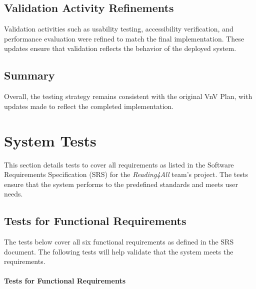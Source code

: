\documentclass[12pt, titlepage]{article}
\begin{document}
\subsection{Validation Activity Refinements}
Validation activities such as usability testing, accessibility verification,
and performance evaluation were refined to match the final implementation.
These updates ensure that validation reflects the behavior of the deployed
system.

\subsection{Summary}
Overall, the testing strategy remains consistent with the original VnV Plan,
with updates made to reflect the completed implementation.
\section{System Tests}
\label{System Tests Desc}

This section details tests to cover all requirements as listed in the
Software Requirements Specification (SRS) for the \textit{Reading4All} team's project. The
tests ensure that the system performs to the predefined standards and
meets user needs.

\subsection{Tests for Functional Requirements}

The tests below cover all six functional requirements as defined in
the SRS document. The following tests will help validate that the system meets 
the requirements. 

\paragraph{Tests for Functional Requirements}
\end{document}
